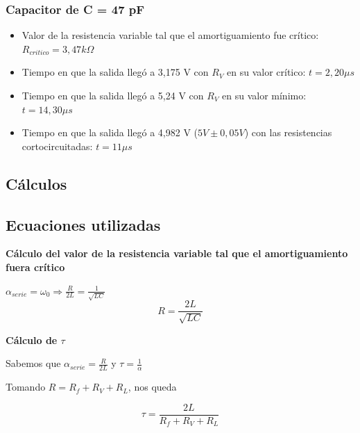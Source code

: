\documentclass{article}
\begin{document}
        \par
        \subsubsection*{Capacitor de C = 47 pF}
            \begin{itemize}
                \item Valor de la resistencia variable tal que el amortiguamiento fue crítico: $ R_{critico} = 3,47 k\Omega $ %
                \item Tiempo en que la salida llegó a 3,175 V con $ R_V $ en su valor crítico: $ t = 2,20 \mu s$ %
                \item Tiempo en que la salida llegó a 5,24 V con $ R_V $ en su valor mínimo: $ t = 14,30 \mu s$ %
                \item Tiempo en que la salida llegó a 4,982 V ($ 5V \pm 0,05V $) con las resistencias cortocircuitadas: $ t = 11 \mu s$ %
            \end{itemize}

    \subsection{Cálculos}

        \subsection{Ecuaciones utilizadas}
            \textbf{Cálculo del valor de la resistencia variable tal que el amortiguamiento fuera crítico} \par \par
            $ \alpha_{serie} = \omega_0 \Rightarrow \frac{R}{2L} = \frac{1}{\sqrt{LC}} $
            \begin{equation}
                R = \frac{2L}{\sqrt{LC}}
            \end{equation}
            
            \par \par 

            \textbf{Cálculo de $ \tau $} \par \par
            Sabemos que $ \alpha_{serie} = \frac{R}{2L} $ y $ \tau = \frac{1}{\alpha} $  \par \par
            Tomando $ R = R_f + R_V + R_L $, nos queda \par \par
            \begin{equation}
                \tau = \frac{2L}{R_f + R_V + R_L} 
            \end{equation}
\end{document}
